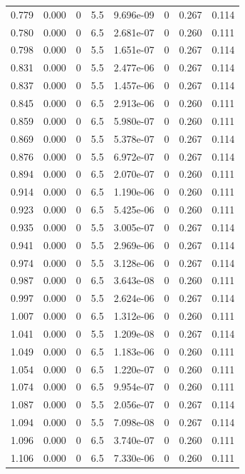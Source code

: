 \documentclass[preview]{standalone}
\begin{document}
{{{\begin{tabular}{L{1.2cm}C{1.2cm} C{0.3cm}C{0.5cm} C{1.4cm}C{1.4cm} C{1.4cm}C{1.4cm}}
  0.779  &  0.000  & 0     & 5.5 &  9.696e-09  & 0  & 0.267 &  0.114   \\ 
  0.780  &  0.000  & 0     & 6.5 &  2.681e-07  & 0  & 0.260 &  0.111   \\ 
  0.798  &  0.000  & 0     & 5.5 &  1.651e-07  & 0  & 0.267 &  0.114   \\ 
  0.831  &  0.000  & 0     & 5.5 &  2.477e-06  & 0  & 0.267 &  0.114   \\ 
  0.837  &  0.000  & 0     & 5.5 &  1.457e-06  & 0  & 0.267 &  0.114   \\ 
  0.845  &  0.000  & 0     & 6.5 &  2.913e-06  & 0  & 0.260 &  0.111   \\ 
  0.859  &  0.000  & 0     & 6.5 &  5.980e-07  & 0  & 0.260 &  0.111   \\ 
  0.869  &  0.000  & 0     & 5.5 &  5.378e-07  & 0  & 0.267 &  0.114   \\ 
  0.876  &  0.000  & 0     & 5.5 &  6.972e-07  & 0  & 0.267 &  0.114   \\ 
  0.894  &  0.000  & 0     & 6.5 &  2.070e-07  & 0  & 0.260 &  0.111   \\ 
  0.914  &  0.000  & 0     & 6.5 &  1.190e-06  & 0  & 0.260 &  0.111   \\ 
  0.923  &  0.000  & 0     & 6.5 &  5.425e-06  & 0  & 0.260 &  0.111   \\ 
  0.935  &  0.000  & 0     & 5.5 &  3.005e-07  & 0  & 0.267 &  0.114   \\ 
  0.941  &  0.000  & 0     & 5.5 &  2.969e-06  & 0  & 0.267 &  0.114   \\ 
  0.974  &  0.000  & 0     & 5.5 &  3.128e-06  & 0  & 0.267 &  0.114   \\ 
  0.987  &  0.000  & 0     & 6.5 &  3.643e-08  & 0  & 0.260 &  0.111   \\ 
  0.997  &  0.000  & 0     & 5.5 &  2.624e-06  & 0  & 0.267 &  0.114   \\ 
  1.007  &  0.000  & 0     & 6.5 &  1.312e-06  & 0  & 0.260 &  0.111   \\ 
  1.041  &  0.000  & 0     & 5.5 &  1.209e-08  & 0  & 0.267 &  0.114   \\ 
  1.049  &  0.000  & 0     & 6.5 &  1.183e-06  & 0  & 0.260 &  0.111   \\ 
  1.054  &  0.000  & 0     & 6.5 &  1.220e-07  & 0  & 0.260 &  0.111   \\ 
  1.074  &  0.000  & 0     & 6.5 &  9.954e-07  & 0  & 0.260 &  0.111   \\ 
  1.087  &  0.000  & 0     & 5.5 &  2.056e-07  & 0  & 0.267 &  0.114   \\ 
  1.094  &  0.000  & 0     & 5.5 &  7.098e-08  & 0  & 0.267 &  0.114   \\ 
  1.096  &  0.000  & 0     & 6.5 &  3.740e-07  & 0  & 0.260 &  0.111   \\ 
  1.106  &  0.000  & 0     & 6.5 &  7.330e-06  & 0  & 0.260 &  0.111   \\ 
\hline 
\end{tabular} 

}}}
\end{document}
